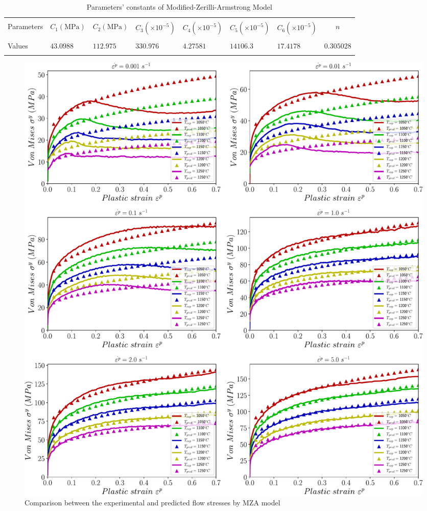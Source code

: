 \documentclass[twoside,english,1p,final,sort&compress]{elsarticle}
\theoremstyle{plain}
\begin{document}
\begin{table}[h!]
\centering{}
\caption{Parameters' constants of Modified-Zerilli-Armstrong Model}
\begin{tabular}{lllllllc}
\hline
&         &             &		   &		 &			   &&\\
Parameters&$C_1(\text{MPa})$    &$C_2(\text{MPa})$        & $C_3(\times10^{-5})$     & $C_4(\times10^{-5})$   & $C_5(\times10^{-5})$       &$C_6(\times10^{-5})$&$n$\\
&         &             &		   &	     &	           &&\\
\hline
Values&$43.0988$&$112.975$& $330.976$&$4.27581$&$14106.3$&$17.4178$&$0.305028$\\
\hline
\label{tab: MZAparameters}
\end{tabular}
\end{table}
\begin{figure}[!ht]
\centering
\includegraphics[width=1.02\columnwidth]
{Figures/CompExpMZA}
\caption{Comparison between the experimental and predicted flow stresses by MZA model}
\label{fig:iCorrelationMZA}
\end{figure}
\FloatBarrier

\end{document}
